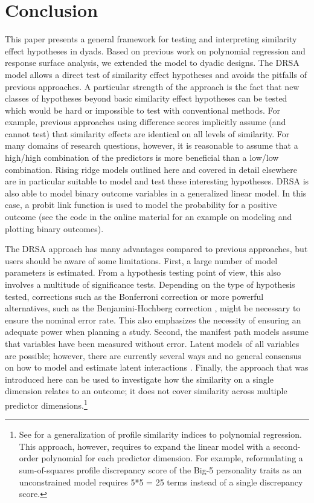 \documentclass[jou,a4paper,draftfirst]{apa6}
\begin{document}
\section{Conclusion}
This paper presents a general framework for testing and interpreting similarity effect hypotheses in dyads. Based on previous work on polynomial regression and response surface analysis, we extended the model to dyadic designs. The DRSA model allows a direct test of similarity effect hypotheses and avoids the pitfalls of previous approaches. A particular strength of the approach is the fact that new classes of hypotheses beyond basic similarity effect hypotheses can be tested which would be hard or impossible to test with conventional methods. For example, previous approaches using difference scores implicitly assume (and cannot test) that similarity effects are identical on all levels of similarity. For many domains of research questions, however, it is reasonable to assume that a high/high combination of the predictors is more beneficial than a low/low combination. Rising ridge models outlined here and covered in detail elsewhere \parencite{schonbrodt_testing_2015} are in particular suitable to model and test these interesting hypotheses. DRSA is also able to model binary outcome variables in a generalized linear model. In this case, a probit link function is used to model the probability for a positive outcome (see the code in the online material for an example on modeling and plotting binary outcomes).

The DRSA approach has many advantages compared to previous approaches, but users should be aware of some limitations. First, a large number of model parameters is estimated. From a hypothesis testing point of view, this also involves a multitude of significance tests. Depending on the type of hypothesis tested, corrections such as the Bonferroni correction \parencite{bonferroni_il_1935} or more powerful alternatives, such as the Benjamini-Hochberg correction \parencite{benjamini_controlling_1995}, might be necessary to ensure the nominal error rate. This also emphasizes the necessity of ensuring an adequate power when planning a study.
Second, the manifest path models assume that variables have been measured without error. Latent models of all variables are possible; however, there are currently several ways and no general consensus on how to model and estimate latent interactions \parencite[e.g.,][]{harring_comparison_2012}.
Finally, the approach that was introduced here can be used to investigate how the similarity on a single dimension relates to an outcome; it does not cover similarity across multiple predictor dimensions.\footnote{See \textcite{edwards_study_1994} for a generalization of profile similarity indices to polynomial regression. This approach, however, requires to expand the linear model with a second-order polynomial for each predictor dimension. For example, reformulating a sum-of-squares profile discrepancy score of the Big-5 personality traits as an unconstrained model requires 5*5 = 25 terms instead of a single discrepancy score.}
\end{document}
